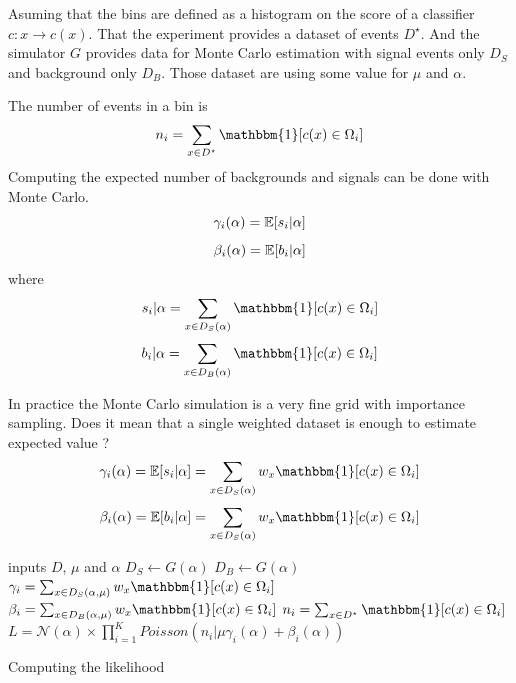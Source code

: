 Asuming that the bins are defined as a histogram on the score of a classifier $c : x \to c(x)$.
That the experiment provides a dataset of events $D^\star$.
And the simulator $G$ provides data for Monte Carlo estimation with signal events only $D_S$ and background only $D_B$.
Those dataset are using some value for $\mu$ and $\alpha$.

The number of events in a bin is 
\begin{equation}
  n_i = \sum_{x \in D^\star} \mathbbm{1} [c(x)\in \Omega_i]
\end{equation}
Computing the expected number of backgrounds and signals can be done with Monte Carlo.
\begin{equation}
  \gamma_i(\alpha) = \mathbb{E}[s_i|\alpha]
\end{equation}
\begin{equation}
  \beta_i(\alpha) = \mathbb{E}[b_i|\alpha]
\end{equation}
where 
\begin{equation}
  s_i | \alpha = \sum_{x \in D_S(\alpha)} \mathbbm{1} [c(x)\in \Omega_i]
\end{equation}
\begin{equation}
  b_i | \alpha = \sum_{x \in D_B(\alpha)} \mathbbm{1} [c(x)\in \Omega_i]
\end{equation}

In practice the Monte Carlo simulation is a very fine grid with importance sampling.
Does it mean that a single weighted dataset is enough to estimate expected value ?
\begin{equation}
  \gamma_i(\alpha) = \EE[s_i | \alpha] = \sum_{x \in D_S(\alpha)} w_x \mathbbm{1} [c(x)\in \Omega_i]
\end{equation}
\begin{equation}
  \beta_i(\alpha) = \EE[b_i | \alpha] = \sum_{x \in D_S(\alpha)} w_x \mathbbm{1} [c(x)\in \Omega_i]
\end{equation}


\begin{algorithm}[H]
 inputs $D$, $\mu$ and $\alpha$ \;
 $D_S \gets G(\alpha)$ \;
 $D_B \gets G(\alpha)$ \;
 $\gamma_i =  \sum_{x \in D_S(\alpha, \mu)} w_x \mathbbm{1} [c(x)\in \Omega_i] $ \;
 $\beta_i =  \sum_{x \in D_B(\alpha, \mu)} w_x \mathbbm{1} [c(x)\in \Omega_i] $ \;
 $n_i = \sum_{x \in D^\star} \mathbbm{1} [c(x)\in \Omega_i]$ \;
 $L = \mathcal N (\alpha) \times \prod_{i=1}^K Poisson(n_i | \mu \gamma_i(\alpha) + \beta_i(\alpha) )$ \;
\caption{Computing the likelihood}
\end{algorithm}

